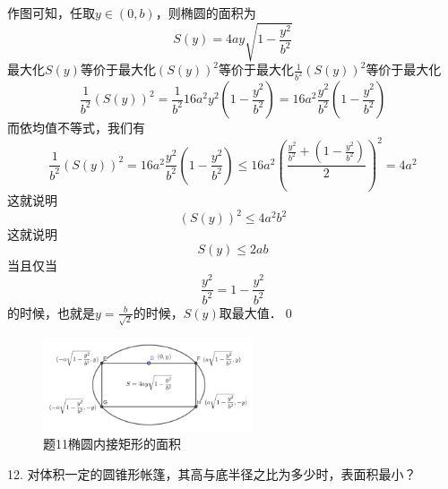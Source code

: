 \solve 作图可知，任取$y \in (0, b)$，则椭圆的面积为
\begin{equation}
    S(y) = 4ay \sqrt{1-\frac{y^2}{b^2}}
\end{equation}
最大化$S(y)$等价于最大化$\left(S(y)\right)^2$等价于最大化$\displaystyle\frac{1}{b^2}\left(S(y)\right)^2$等价于最大化
\begin{equation}
    \frac{1}{b^2} \left(S(y)\right)^2 = \frac{1}{b^2} 16 a^2 y^2 \left(1-\frac{y^2}{b^2}\right) = 16 a^2 \frac{y^2}{b^2} \left(1 - \frac{y^2}{b^2}\right)
\end{equation}
而依均值不等式，我们有
\begin{equation}
    \frac{1}{b^2} \left(S(y)\right)^2 = 16 a^2 \frac{y^2}{b^2} \left(1  - \frac{y^2}{b^2}\right) \leq 16 a^2 \left(\frac{\displaystyle\frac{y^2}{b^2} + \left(1-\displaystyle\frac{y^2}{b^2}\right)}{2}\right)^{2} = 4a^2
\end{equation}
这就说明
\begin{equation}
    \left(S(y)\right)^2 \leq 4 a^2 b^2
\end{equation}
这就说明
\begin{equation}
    S(y) \leq 2 ab
\end{equation}
当且仅当
\begin{equation}
    \frac{y^2}{b^2} = 1 - \frac{y^2}{b^2}
\end{equation}
的时候，也就是$y = \displaystyle\frac{b}{\sqrt{2}}$的时候，$S(y)$取最大值．\qed\bigskip

\begin{figure}[H]
    \centering
    \includegraphics[width=0.55\textwidth]{chapter3/ellipseSquare.png}
    \caption{题11椭圆内接矩形的面积}
\end{figure}

12. 对体积一定的圆锥形帐篷，其高与底半径之比为多少时，表面积最小？

